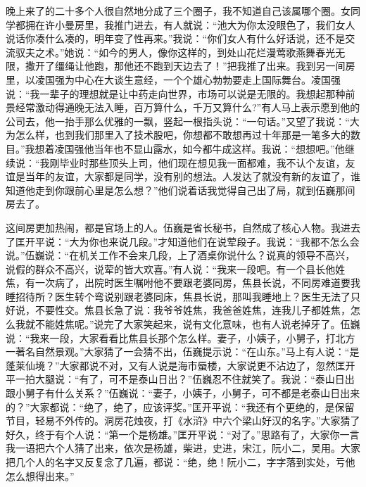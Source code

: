 \documentclass[12pt,oneside]{book}
\begin{document}
晚上来了的二十多个人很自然地分成了三个圈子，我不知道自己该属哪个圈。女同学都拥在许小曼房里，我推门进去，有人就说：``池大为你太没眼色了，我们女人说话你凑什么凑的，明年变了性再来。''我说：``你们女人有什么好话说，还不是交流驭夫之术。''她说：``如今的男人，像你这样的，到处山花烂漫莺歌燕舞春光无限，撒开了缰绳让他跑，那他还不跑到天边去了！''把我推了出来。我到另一间房里，以凌国强为中心在大谈生意经，一个个雄心勃勃要走上国际舞台。凌国强说：``我一辈子的理想就是让中药走向世界，市场可以说是无限的。我想起那种前景经常激动得通晚无法入睡，百万算什么，千万又算什么?''有人马上表示愿到他的公司去，他一抬手那么优雅的一飘，竖起一根指头说：``一句话。''又望了我说：``大为怎么样，也到我们那里入了技术股吧，你想都不敢想再过十年那是一笔多大的数目。''我想着凌国强他当年也不显山露水，如今都牛成这样。我说：``想想吧。''他继续说：``我刚毕业时那些顶头上司，他们现在想见我一面都难，我不认个友谊，友谊是当年的友谊，大家都是同学，没有别的想法。人发达了就没有新的友谊了，谁知道他走到你跟前心里是怎么想？''他们说着话我觉得自己出了局，就到伍巍那间房去了。

这间房更加热闹，都是官场上的人。伍巍是省长秘书，自然成了核心人物。我进去了匡开平说：``大为你也来说几段。''才知道他们在说荤段子。我说：``我都不怎么会说。''伍巍说：``在机关工作不会来几段，上了酒桌你说什么？说真的领导不高兴，说假的群众不高兴，说荤的皆大欢喜。''有人说：``我来一段吧。有一个县长他姓焦，有一次病了，出院时医生嘱咐他不要跟老婆同房，焦县长说，不同房难道要我睡招待所？医生转个弯说别跟老婆同床，焦县长说，那叫我睡地上？医生无法了只好说，不要性交。焦县长急了说：我爷爷姓焦，我爸爸姓焦，连我儿子都姓焦，怎么我就不能姓焦呢。''说完了大家笑起来，说有文化意味，也有人说老掉牙了。伍巍说：``我来一段，大家看看比焦县长那个怎么样。妻子，小姨子，小舅子，打北方一著名自然景观。''大家猜了一会猜不出，伍巍提示说：``在山东。''马上有人说：``是蓬莱仙境？''大家都说不对，又有人说是海市蜃楼，大家说更不沾边了，忽然匡开平一拍大腿说：``有了，可不是泰山日出？''伍巍忍不住就笑了。我说：``泰山日出跟小舅子有什么关系？''伍巍说：``妻子，小姨子，小舅子，可不都是老泰山日出来的？''大家都说：``绝了，绝了，应该评奖。''匡开平说：``我还有个更绝的，是保留节目，轻易不外传的。洞房花烛夜，打《水浒》中六个梁山好汉的名字。''大家猜了好久，终于有个人说：``第一个是杨雄。''匡开平说：``对了。''思路有了，大家你一言我一语把六个人猜了出来，依次是杨雄，柴进，史进，宋江，阮小二，吴用。大家把几个人的名字又反复念了几遍，都说：``绝，绝！阮小二，字字落到实处，亏他怎么想得出来。''
\end{document}
